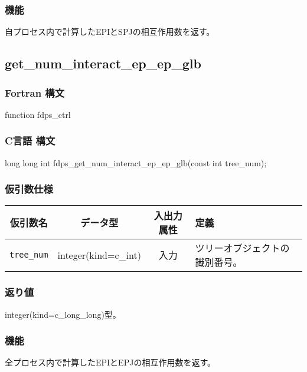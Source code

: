\subsubsection*{機能}
自プロセス内で計算したEPIとSPJの相互作用数を返す。
\clearpage

\subsection{get\_num\_interact\_ep\_ep\_glb}
\subsubsection*{Fortran 構文}
\begin{screen}
\begin{spverbatim}
function fdps_ctrl%
\end{spverbatim}
\end{screen}

\subsubsection*{C言語 構文}
\begin{screen}
\begin{spverbatim}
long long int fdps_get_num_interact_ep_ep_glb(const int tree_num);
\end{spverbatim}
\end{screen}

\subsubsection*{仮引数仕様}
\begin{table}[h]
\begin{tabularx}{\linewidth}{cccX}
\toprule
\rowcolor{Snow2}
仮引数名 & データ型 & 入出力属性 & 定義 \\
\midrule
\verb|tree_num|  & integer(kind=c\_int)   & 入力     & ツリーオブジェクトの識別番号。\\
\bottomrule
\end{tabularx}
\end{table}

\subsubsection*{返り値}
integer(kind=c\_long\_long)型。

\subsubsection*{機能}
全プロセス内で計算したEPIとEPJの相互作用数を返す。
\clearpage

